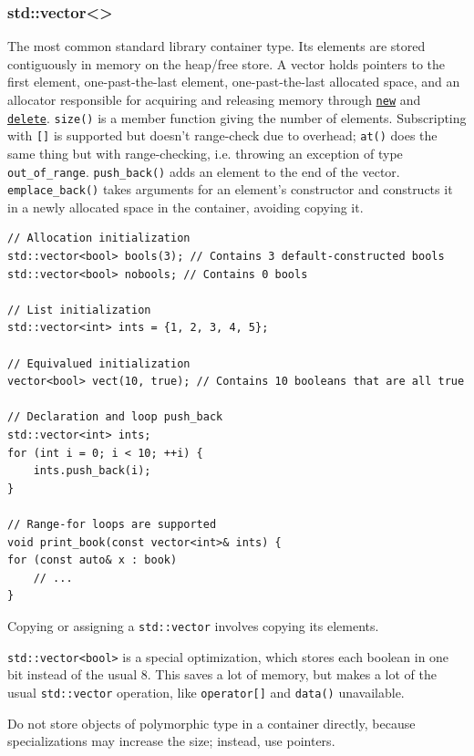 \documentclass[table, xcdraw]{article}%
\begin{document}
\subsubsection{std::vector<>} \label{std_vector}

The most common standard library container type. Its elements are stored contiguously in memory on the heap/free store. A vector holds pointers to the first element, one-past-the-last element, one-past-the-last allocated space, and an allocator responsible for acquiring and releasing memory through \hyperref[new]{\texttt{new}} and \hyperref[delete]{\texttt{delete}}. \texttt{size()} is a member function giving the number of elements. Subscripting with \texttt{[]} is supported but doesn't range-check due to overhead; \texttt{at()} does the same thing but with range-checking, i.e. throwing an exception of type \texttt{out_of_range}. \texttt{push_back()} adds an element to the end of the vector. \texttt{emplace_back()} takes arguments for an element’s constructor and constructs it in a newly allocated space in the container, avoiding copying it.

\begin{verbatim}
// Allocation initialization
std::vector<bool> bools(3); // Contains 3 default-constructed bools
std::vector<bool> nobools; // Contains 0 bools

// List initialization
std::vector<int> ints = {1, 2, 3, 4, 5};

// Equivalued initialization
vector<bool> vect(10, true); // Contains 10 booleans that are all true

// Declaration and loop push_back
std::vector<int> ints;
for (int i = 0; i < 10; ++i) {
    ints.push_back(i);
}

// Range-for loops are supported
void print_book(const vector<int>& ints) {
for (const auto& x : book)
    // ...
}
\end{verbatim}

Copying or assigning a \texttt{std::vector} involves copying its elements.

\texttt{std::vector<bool>} is a special optimization, which stores each boolean in one bit instead of the usual 8. This saves a lot of memory, but makes a lot of the usual \texttt{std::vector} operation, like \texttt{operator[]} and \texttt{data()} unavailable.

Do not store objects of polymorphic type in a container directly, because specializations may increase the size; instead, use pointers.
\end{document}
